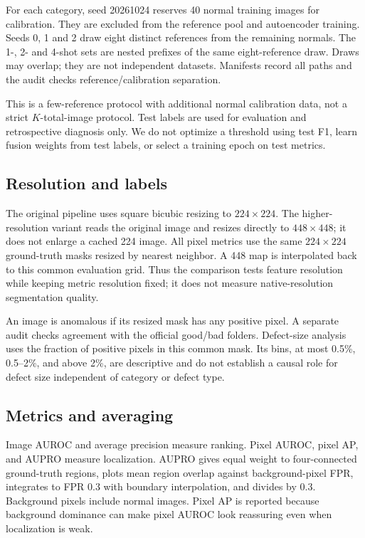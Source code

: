 \documentclass[10pt,twocolumn,letterpaper]{article}
\begin{document}
For each category, seed 20261024 reserves 40 normal training images for calibration. They are excluded from the reference pool and autoencoder training. Seeds 0, 1 and 2 draw eight distinct references from the remaining normals. The 1-, 2- and 4-shot sets are nested prefixes of the same eight-reference draw. Draws may overlap; they are not independent datasets. Manifests record all paths and the audit checks reference/calibration separation.

This is a few-reference protocol with additional normal calibration data, not a strict $K$-total-image protocol. Test labels are used for evaluation and retrospective diagnosis only. We do not optimize a threshold using test F1, learn fusion weights from test labels, or select a training epoch on test metrics.
\subsection{Resolution and labels}
The original pipeline uses square bicubic resizing to $224\times224$. The higher-resolution variant reads the original image and resizes directly to $448\times448$; it does not enlarge a cached 224 image. All pixel metrics use the same $224\times224$ ground-truth masks resized by nearest neighbor. A 448 map is interpolated back to this common evaluation grid. Thus the comparison tests feature resolution while keeping metric resolution fixed; it does not measure native-resolution segmentation quality.

An image is anomalous if its resized mask has any positive pixel. A separate audit checks agreement with the official good/bad folders. Defect-size analysis uses the fraction of positive pixels in this common mask. Its bins, at most 0.5\%, 0.5--2\%, and above 2\%, are descriptive and do not establish a causal role for defect size independent of category or defect type.
\subsection{Metrics and averaging}
Image AUROC and average precision measure ranking. Pixel AUROC, pixel AP, and AUPRO measure localization. AUPRO gives equal weight to four-connected ground-truth regions, plots mean region overlap against background-pixel FPR, integrates to FPR 0.3 with boundary interpolation, and divides by 0.3. Background pixels include normal images. Pixel AP is reported because background dominance can make pixel AUROC look reassuring even when localization is weak.
\end{document}
